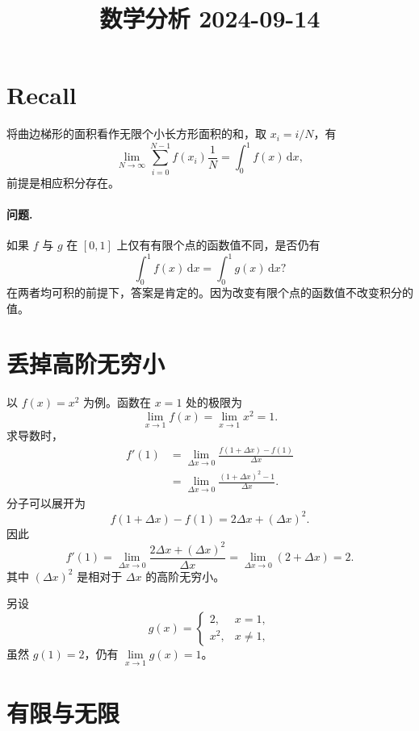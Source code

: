 \documentclass[UTF8,11pt]{ctexart}
\title{数学分析 2024-09-14}
\date{}
\theoremstyle{cnthm}
\begin{document}
\maketitle

\section{Recall}


将曲边梯形的面积看作无限个小长方形面积的和，取 \(x_i=i/N\)，有
\[
\lim_{N\to\infty}
\sum_{i=0}^{N-1} f(x_i)\frac1N
=
\int_0^1 f(x)\,\mathrm dx,
\]
前提是相应积分存在。

\paragraph{问题.}
如果 \(f\) 与 \(g\) 在 \([0,1]\) 上仅有有限个点的函数值不同，是否仍有
\[
\int_0^1 f(x)\,\mathrm dx
=
\int_0^1 g(x)\,\mathrm dx?
\]
在两者均可积的前提下，答案是肯定的。因为改变有限个点的函数值不改变积分的值。

\section{丢掉高阶无穷小}

以 \(f(x)=x^2\) 为例。函数在 \(x=1\) 处的极限为
\[
\lim_{x\to1} f(x)=\lim_{x\to1} x^2=1.
\]
求导数时，
\begin{align*}
f'(1)
&=\lim\limits_{\Delta x\to0}
  \frac{f(1+\Delta x)-f(1)}{\Delta x}\\
&=\lim\limits_{\Delta x\to0}
  \frac{(1+\Delta x)^2-1}{\Delta x}.
\end{align*}
分子可以展开为
\[
f(1+\Delta x)-f(1)
=
2\Delta x+(\Delta x)^2.
\]
因此
\[
f'(1)
=
\lim_{\Delta x\to0}
 \frac{2\Delta x+(\Delta x)^2}{\Delta x}
=
\lim_{\Delta x\to0}(2+\Delta x)=2.
\]
其中 \((\Delta x)^2\) 是相对于 \(\Delta x\) 的高阶无穷小。

另设
\[
g(x)=
\begin{cases}
2,&x=1,\\
x^2,&x\ne1,
\end{cases}
\]
虽然 \(g(1)=2\)，仍有 \(\lim\limits_{x\to1} g(x)=1\)。

\section{有限与无限}
\end{document}
